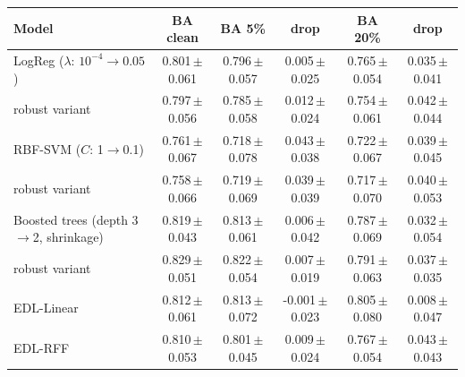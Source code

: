 \begin{tabular}{lccccc}\toprule
Model & BA clean & BA 5\% & drop & BA 20\% & drop\\\midrule
LogReg ($\lambda$: $10^{-4}\!\to\!0.05$) & 0.801\,{\scriptsize$\pm$0.061} & 0.796\,{\scriptsize$\pm$0.057} & 0.005\,{\scriptsize$\pm$0.025} & 0.765\,{\scriptsize$\pm$0.054} & 0.035\,{\scriptsize$\pm$0.041}\\
\quad robust variant & 0.797\,{\scriptsize$\pm$0.056} & 0.785\,{\scriptsize$\pm$0.058} & 0.012\,{\scriptsize$\pm$0.024} & 0.754\,{\scriptsize$\pm$0.061} & 0.042\,{\scriptsize$\pm$0.044}\\
RBF-SVM ($C$: 1$\to$0.1) & 0.761\,{\scriptsize$\pm$0.067} & 0.718\,{\scriptsize$\pm$0.078} & 0.043\,{\scriptsize$\pm$0.038} & 0.722\,{\scriptsize$\pm$0.067} & 0.039\,{\scriptsize$\pm$0.045}\\
\quad robust variant & 0.758\,{\scriptsize$\pm$0.066} & 0.719\,{\scriptsize$\pm$0.069} & 0.039\,{\scriptsize$\pm$0.039} & 0.717\,{\scriptsize$\pm$0.070} & 0.040\,{\scriptsize$\pm$0.053}\\
Boosted trees (depth 3$\to$2, shrinkage) & 0.819\,{\scriptsize$\pm$0.043} & 0.813\,{\scriptsize$\pm$0.061} & 0.006\,{\scriptsize$\pm$0.042} & 0.787\,{\scriptsize$\pm$0.069} & 0.032\,{\scriptsize$\pm$0.054}\\
\quad robust variant & 0.829\,{\scriptsize$\pm$0.051} & 0.822\,{\scriptsize$\pm$0.054} & 0.007\,{\scriptsize$\pm$0.019} & 0.791\,{\scriptsize$\pm$0.063} & 0.037\,{\scriptsize$\pm$0.035}\\
EDL-Linear & 0.812\,{\scriptsize$\pm$0.061} & 0.813\,{\scriptsize$\pm$0.072} & -0.001\,{\scriptsize$\pm$0.023} & 0.805\,{\scriptsize$\pm$0.080} & 0.008\,{\scriptsize$\pm$0.047}\\
EDL-RFF & 0.810\,{\scriptsize$\pm$0.053} & 0.801\,{\scriptsize$\pm$0.045} & 0.009\,{\scriptsize$\pm$0.024} & 0.767\,{\scriptsize$\pm$0.054} & 0.043\,{\scriptsize$\pm$0.043}\\
\bottomrule\end{tabular}